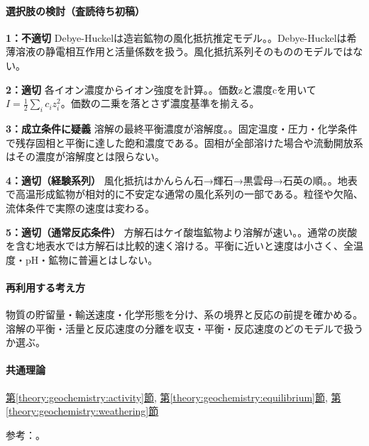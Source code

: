 \paragraph{選択肢の検討（査読待ち初稿）}\mbox{}\par

\noindent\textbf{1：不適切} Debye-Huckelは造岩鉱物の風化抵抗推定モデル。。Debye-Huckelは希薄溶液の静電相互作用と活量係数を扱う。風化抵抗系列そのもののモデルではない。\par

\noindent\textbf{2：適切} 各イオン濃度からイオン強度を計算。。価数zと濃度cを用いて\(I=\frac12\sum_i c_i z_i^2\)。価数の二乗を落とさず濃度基準を揃える。\par

\noindent\textbf{3：成立条件に疑義} 溶解の最終平衡濃度が溶解度。。固定温度・圧力・化学条件で残存固相と平衡に達した飽和濃度である。固相が全部溶けた場合や流動開放系はその濃度が溶解度とは限らない。\par

\noindent\textbf{4：適切（経験系列）} 風化抵抗はかんらん石→輝石→黒雲母→石英の順。。地表で高温形成鉱物が相対的に不安定な通常の風化系列の一部である。粒径や欠陥、流体条件で実際の速度は変わる。\par

\noindent\textbf{5：適切（通常反応条件）} 方解石はケイ酸塩鉱物より溶解が速い。。通常の炭酸を含む地表水では方解石は比較的速く溶ける。平衡に近いと速度は小さく、全温度・pH・鉱物に普遍とはしない。\par

\paragraph{再利用する考え方} 物質の貯留量・輸送速度・化学形態を分け、系の境界と反応の前提を確かめる。溶解の平衡・活量と反応速度の分離を収支・平衡・反応速度のどのモデルで扱うか選ぶ。

\paragraph{共通理論} \hyperref[theory:geochemistry:activity]{第\ref*{theory:geochemistry:activity}節}, \hyperref[theory:geochemistry:equilibrium]{第\ref*{theory:geochemistry:equilibrium}節}, \hyperref[theory:geochemistry:weathering]{第\ref*{theory:geochemistry:weathering}節}

\par 参考：\cite{gc_debye,gc_hem,gc_clays}。

